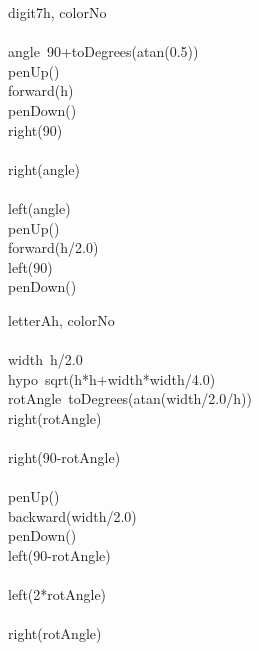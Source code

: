 \documentclass[a4paper,10pt]{article}
\begin{document}
\begin{pseudocode}{digit7}{h, colorNo }
\label{digit7}
\\
\\
  angle\gets\ 90+toDegrees(atan(0.5))\\
  penUp()\\
  forward(h)\\
  penDown()\\
  right(90)\\
  \\
  right(angle)\\
  \\
  left(angle)\\
  penUp()\\
  forward(h/2.0)\\
  left(90)\\
  penDown()\\
\ENDPROCEDURE
\end{pseudocode}


\begin{pseudocode}{letterA}{h, colorNo }
\label{letterA}
\\
\\
  width\gets\ h/2.0\\
  hypo\gets\ sqrt(h*h+width*width/4.0)\\
  rotAngle\gets\ toDegrees(atan(width/2.0/h))\\
  right(rotAngle)\\
  \\
  right(90-rotAngle)\\
  \\
  penUp()\\
  backward(width/2.0)\\
  penDown()\\
  left(90-rotAngle)\\
  \\
  left(2*rotAngle)\\
  \\
  right(rotAngle)\\
\ENDPROCEDURE
\end{pseudocode}
\end{document}
